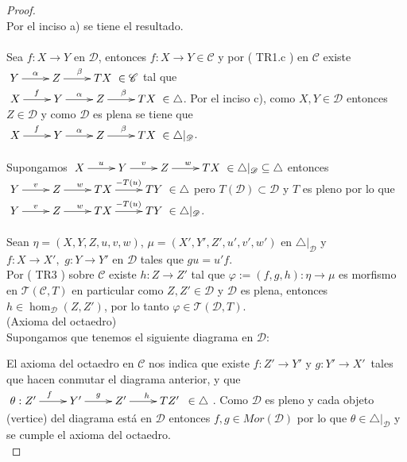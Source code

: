 \documentclass{article}
\begin{document}
\begin{enumerate}
\begin{proof}
\\
Por el inciso a) se tiene el resultado.\\

\\
Sea $f:X\to Y$ en $\mathscr{D}$, entonces $f:X\to Y\in \mathscr{C}$ y por ( TR1.c ) en $\mathscr{C}$ existe
$\xymatrix{Y\ar[r]^{\alpha}&Z\ar[r]^{\beta}&TX}\in \mathscr{C}$ tal que \\
$\xymatrix{X\ar[r]^{f}&Y\ar[r]^{\alpha}&Z\ar[r]^{\beta}&TX}\in \triangle$. Por el inciso c), como $X,Y\in \mathscr{D}$ entonces $Z\in \mathscr{D}$
y como $\mathscr{D}$ es plena se tiene que \\$\xymatrix{X\ar[r]^{f}&Y\ar[r]^{\alpha}&Z\ar[r]^{\beta}&TX}\in \triangle|_{\mathscr{D}}$.\\

\\
Supongamos $\xymatrix{X\ar[r]^{u}&Y\ar[r]^{v}&Z\ar[r]^{w}&TX}\in \triangle|_{\mathscr{D}}\subseteq \triangle$ entonces \\
$\xymatrix{Y\ar[r]^{v}&Z\ar[r]^{w}&TX\ar[r]^{-T(u)}&TY}\in \triangle$ pero $T(\mathscr{D})\subset \mathscr{D}$ y $T$ es pleno por lo que 
$\xymatrix{Y\ar[r]^{v}&Z\ar[r]^{w}&TX\ar[r]^{-T(u)}&TY}\in \triangle|_{\mathscr{D}}$.\\

\\
Sean $\eta=(X,Y,Z,u,v,w)$, $\mu=(X',Y',Z',u',v',w')$ en $\triangle|_{\mathscr{D}}$ y\\$f:X\to X',\,\, g:Y\to Y'$ en $\mathscr{D}$ tales que $gu=u'f$.\\
Por ( TR3 ) sobre $\mathscr{C}$ existe $h:Z\to Z'$ tal que $\varphi:=(f,g,h):\eta\to \mu$ es morfismo en $\mathscr{T}(\mathscr{C},T)$ en particular
como $Z,Z'\in \mathscr{D}$ y $\mathscr{D}$ es plena, entonces $h\in \hom_{\mathscr{D}}(Z,Z')$, por lo tanto $\varphi\in \mathscr{T}(\mathscr{D},T)$.
\\

 (Axioma del octaedro)\\
Supongamos que tenemos el siguiente diagrama en $\mathscr{D}$:\\
\centerline{
} 
El axioma del octaedro en $\mathscr{C}$ nos indica que existe $f:Z'\to Y'$ y $g:Y'\to X'$ \,tales que hacen conmutar el diagrama anterior, y que\\
$\xymatrix{\theta:Z'\ar[r]^f&Y'\ar[r]^g&Z'\ar[r]^{h\quad}&TZ' \,\,\, \in \triangle}$. Como $\mathscr{D}$ es pleno y cada objeto (vertice) 
del diagrama está en 
$\mathscr{D}$ entonces $f,g\in Mor(\mathscr{D})$ por lo que $\theta\in  \triangle|_{\mathscr{D}}$ y se cumple el axioma del octaedro.\\


\end{proof}
\end{enumerate}
\end{document}
